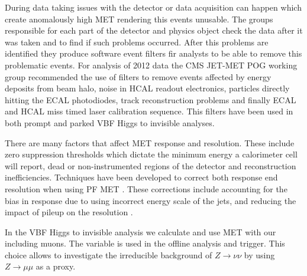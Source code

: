 During data taking issues with the detector or data acquisition can happen which create anomalously high \gls{MET} rendering this events unusable. The groups responsible for each part of the detector and physics object check the data after it was taken and to find if such problems occurred. After this problems are identified they produce software event filters fir analysts to be able to remove this problematic events. For analysis of 2012 data the \gls{CMS} JET-MET \gls{POG} working group recommended the use of filters to remove events affected by energy deposits from beam halo, noise in \gls{HCAL} readout electronics, particles directly hitting the \gls{ECAL} photodiodes, track reconstruction problems and finally \gls{ECAL} and \gls{HCAL} miss timed laser calibration sequence. This filters have been used in both prompt and parked \gls{VBF} Higgs to invisible analyses.

There are many factors that affect \gls{MET} response and resolution. These include zero suppression thresholds which dictate the minimum energy a calorimeter cell will report, dead or non-instrumented regions of the detector and reconstruction inefficiencies. Techniques have been developed to correct both response end resolution when using \gls{PF} \gls{MET} \cite{ARTICLE:CMSMissingTransverseEnergyPerformance}. These corrections include accounting for the bias in response due to using incorrect energy scale of the jets, and reducing the impact of pileup on the resolution \cite{ARTICLE:CMSMETPerformance8TeV}.

In the \gls{VBF} Higgs to invisible analysis we calculate and use \gls{MET} with our including muons. The variable is used in the offline analysis and trigger. This choice allows to investigate the irreducible background of $Z \rightarrow \nu\nu$ by using $Z \rightarrow \mu\mu$ as a proxy.

